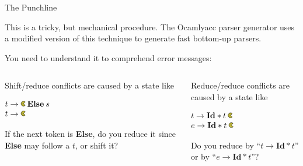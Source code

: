 \documentclass{plt}
\newcommand{\pac}{\begin{tikzpicture}
    \draw [fill=black!30!yellow!100] (2.12pt,2.12pt) arc
    (45:315:3pt) -- (0,0) -- cycle;
  \end{tikzpicture}
}
\newcommand{\id}{\textbf{Id}}
\begin{document}
\begin{frame}{The Punchline}

This is a tricky, but mechanical procedure.  The Ocamlyacc parser
generator uses a modified version of this technique to generate fast
bottom-up parsers.

You need to understand it to comprehend error messages:

\begin{columns}
  \begin{column}{0.5\textwidth}
\raggedright

Shift/reduce conflicts are caused by a state like

\medskip

$\begin{array}{@{}l@{}}
t \rightarrow \pac\> \textbf{Else}\> s \\
t \rightarrow \pac \\
 \end{array}$

\medskip

If the next token is \textbf{Else}, do you reduce it since
\textbf{Else} may follow a $t$, or shift it?
  \end{column}
  \begin{column}{0.5\textwidth}

\raggedright

Reduce/reduce conflicts are caused by a state like

\medskip

$\begin{array}{@{}l@{}}
t \rightarrow \id * t\> \pac \\
e \rightarrow \id * t\> \pac \\
 \end{array}$

\medskip

Do you reduce by ``$t \rightarrow \id * t$'' or by ``$e \rightarrow \id * t$''?

  \end{column}
\end{columns}
\end{frame}


\end{document}
